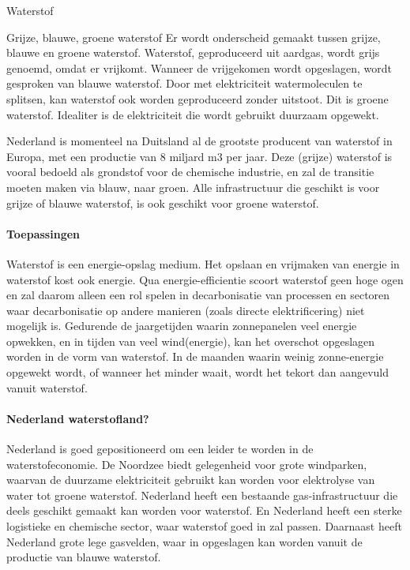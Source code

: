 \begin{voorstel}{Waterstof}
\begin{multicols*}{2}
\begin{overwegingen}
\begin{infobox}{Grijze, blauwe, groene waterstof}
Er wordt onderscheid gemaakt tussen grijze, blauwe en groene waterstof. Waterstof, geproduceerd uit aardgas, wordt grijs genoemd, omdat er \COO vrijkomt. Wanneer de vrijgekomen \COO wordt opgeslagen, wordt gesproken van blauwe waterstof. Door met elektriciteit watermoleculen te splitsen, kan waterstof ook worden geproduceerd zonder \COO uitstoot. Dit is groene waterstof. Idealiter is de elektriciteit die wordt gebruikt duurzaam opgewekt.
\end{infobox}

Nederland is momenteel na Duitsland al de grootste producent van waterstof in Europa, met een productie van 8 miljard m3 per jaar. Deze (grijze) waterstof is vooral bedoeld als grondstof voor de chemische industrie, en zal de transitie moeten maken via blauw, naar groen. Alle infrastructuur die geschikt is voor grijze of blauwe waterstof, is ook geschikt voor groene waterstof.

\paragraph{Toepassingen}
Waterstof is een energie-opslag medium. Het opslaan en vrijmaken van energie in waterstof kost ook energie. Qua energie-efficientie scoort waterstof geen hoge ogen en zal daarom alleen een rol spelen in decarbonisatie van processen en sectoren waar decarbonisatie op andere manieren (zoals directe elektrificering) niet mogelijk is. Gedurende de jaargetijden waarin zonnepanelen veel energie opwekken, en in tijden van veel wind(energie), kan het overschot opgeslagen worden in de vorm van waterstof. In de maanden waarin weinig zonne-energie opgewekt wordt, of wanneer het minder waait, wordt het tekort dan aangevuld vanuit waterstof.

\paragraph{Nederland waterstofland?}
Nederland is goed gepositioneerd om een leider te worden in de waterstofeconomie. De Noordzee biedt gelegenheid voor grote windparken, waarvan de duurzame elektriciteit gebruikt kan worden voor elektrolyse van water tot groene waterstof. Nederland heeft een bestaande gas-infrastructuur die deels geschikt gemaakt kan worden voor waterstof. En Nederland heeft een sterke logistieke en chemische sector, waar waterstof goed in zal passen. Daarnaast heeft Nederland grote lege gasvelden, waar \COO in opgeslagen kan worden vanuit de productie van blauwe waterstof.


\end{overwegingen}
\end{multicols*}
\end{voorstel}
